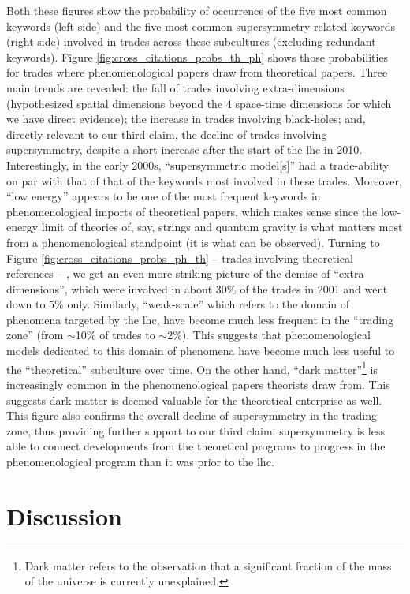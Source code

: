 \documentclass[smallextended]{svjour3}
\begin{document}
Both these figures show the probability of occurrence of the five most common keywords (left side) and the five most common supersymmetry-related keywords (right side) involved in trades across these subcultures (excluding redundant keywords). Figure \ref{fig:cross_citations_probs_th_ph} shows those probabilities for trades where phenomenological papers draw from theoretical papers. Three main trends are revealed: the fall of trades involving extra-dimensions (hypothesized spatial dimensions beyond the 4 space-time dimensions for which we have direct evidence); the increase in trades involving black-holes; and, directly relevant to our third claim, the decline of trades involving supersymmetry, despite a short increase after the start of the \gls{lhc} in 2010. Interestingly, in the early 2000s, ``supersymmetric model[s]'' had a trade-ability on par with that of that of the keywords most involved in these trades. Moreover, ``low energy'' appears to be one of the most frequent keywords in phenomenological imports of theoretical papers, which makes sense since the low-energy limit of theories of, say, strings and quantum gravity is what matters most from a phenomenological standpoint (it is what can be observed). Turning to Figure \ref{fig:cross_citations_probs_ph_th} -- trades involving theoretical references -- , we get an even more striking picture of the demise of ``extra dimensions'', which were involved in about 30\% of the trades in 2001 and went down to 5\% only. Similarly, ``weak-scale''  which refers to the domain of phenomena targeted by the \gls{lhc}, have become much less frequent in the ``trading zone'' (from $\sim$10\% of trades to $\sim$2\%). This suggests that phenomenological models dedicated to this domain of phenomena have become much less useful to the ``theoretical'' subculture over time. On the other hand, ``dark matter''\footnote{Dark matter refers to the observation that a significant fraction of the mass of the universe is currently unexplained.} is increasingly common in the phenomenological papers theorists draw from. This suggests dark matter is deemed valuable for the theoretical enterprise as well. This figure also confirms the overall decline of supersymmetry in the trading zone, thus providing further support to our third claim:  supersymmetry is less able to connect developments from the theoretical programs to progress in the phenomenological program than it was prior to the \gls{lhc}.

\section{\label{section:discussion}Discussion}
\end{document}
